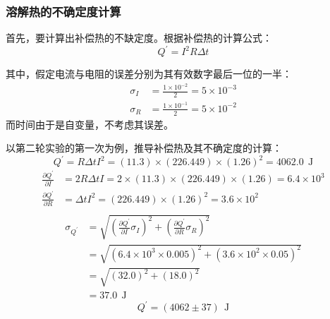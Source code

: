 \documentclass[cn,hazy,pku,12pt,normal,math=newtx,cite=super]{elegantnote}
\begin{document}
\subsubsection{溶解热的不确定度计算}

首先，要计算出补偿热的不缺定度。根据补偿热的计算公式：
\begin{equation}
    Q^\prime = I^2R\Delta t
\end{equation}

其中，假定电流与电阻的误差分别为其有效数字最后一位的一半：
\begin{align*}
    \sigma_I &= \frac{1\times 10^{-2}}{2} = 5\times 10^{-3}\\
    \sigma_R &= \frac{1\times 10^{-1}}{2} = 5\times 10^{-2}
\end{align*}
而时间由于是自变量，不考虑其误差。

以第二轮实验的第一次为例，推导补偿热及其不确定度的计算：
\begin{equation*}
Q^\prime=R \Delta t I^{2}=\left(11.3\right) \times \left(226.449\right) \times \left(1.26\right)^{2}=4062.0\ \mathrm{~J}
\end{equation*}
\begin{equation*}
\begin{aligned}
\frac{\partial Q^\prime }{\partial I }&=2 R \Delta t I=2 \times \left(11.3\right) \times \left(226.449\right) \times \left(1.26\right)=6.4 \times 10^{3}\\
\frac{\partial Q^\prime }{\partial R }&=\Delta t I^{2}=\left(226.449\right) \times \left(1.26\right)^{2}=3.6 \times 10^{2}\\
\end{aligned}
\end{equation*}
\begin{equation*}
\begin{aligned}
\sigma_{Q^\prime}&=\sqrt{\left(\frac{\partial Q^\prime }{\partial I } \sigma_{I}\right)^2+\left(\frac{\partial Q^\prime }{\partial R } \sigma_{R}\right)^2}\\
&=\sqrt{\left(6.4 \times 10^{3} \times 0.005\right)^2+\left(3.6 \times 10^{2} \times 0.05\right)^2}\\
&=\sqrt{\left(32.0\right)^2+\left(18.0\right)^2}\\
&=37.0\ \mathrm{~J}
\end{aligned}
\end{equation*}
\begin{equation*}
Q^\prime=\left (4062 \pm 37 \right )\ \mathrm{~J}
\end{equation*}
\end{document}
